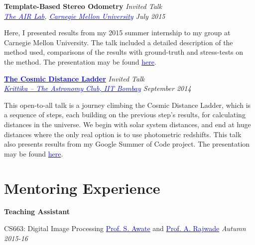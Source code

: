 \documentclass[margin,line]{res}
\newenvironment{list1}{
  \begin{list}{\ding{113}}{%
      \setlength{\itemsep}{0in}
      \setlength{\parsep}{0in} \setlength{\parskip}{0in}
      \setlength{\topsep}{0in} \setlength{\partopsep}{0in} 
      \setlength{\leftmargin}{0.17in}}}{\end{list}}
\begin{document}
\begin{resume}
{\bf Template-Based Stereo Odometry} \hfill {\em Invited Talk} \\
{\em \href{http://theairlab.org/}{\textcolor{blue}{The AIR Lab}}, \href{http://www.cmu.edu/}{\textcolor{blue}{Carnegie Mellon University}} \hfill July 2015} \\
\vspace*{-.15in}
\begin{list1}
\item[] Here, I presented results from my 2015 summer internship to my group at Carnegie Mellon University. The talk included a detailed description of the method used, comparisons of the results with ground-truth and stress-tests on the method. The presentation may be found \href{http://alankarkotwal.github.io/intern_presentation.pptx}{\textcolor{blue} {here}}.
\end{list1}

{\bf \href{http://www.stab-iitb.org/krittika/the-cosmic-ladder-distance}{\textcolor{blue} {The Cosmic Distance Ladder}}} \hfill {\em Invited Talk} \\
{\em \href{http://www.stab-iitb.org/krittika/}{\textcolor{blue} {Krittika -- The Astronomy Club, IIT Bombay}} \hfill September 2014} \\
\vspace*{-.15in}
\begin{list1}
\item[] This open-to-all talk is a journey climbing the Cosmic Distance Ladder, which is a sequence of steps, each building on the previous step's results, for calculating distances in the universe. We begin with solar system distances, and end at huge distances where the only real option is to use photometric redshifts. This talk also presents results from my Google Summer of Code project. The presentation may be found \href{http://alankarkotwal.github.io/CosmicDistanceLadder.pptx}{\textcolor{blue} {here}}.
\end{list1}


\section{\sc Mentoring Experience}
\textbf{Teaching Assistant}
\begin{list1}
\item[]CS663: Digital Image Processing \hspace{0.5cm} \href{https://www.cse.iitb.ac.in/~suyash}{\textcolor{blue}{Prof. S. Awate}} and \href{https://www.cse.iitb.ac.in/~ajitvr}{\textcolor{blue}{Prof. A. Rajwade}} \hfill{\textit{Autumn 2015-16}}
\end{list1}


\end{resume}
\end{document}
